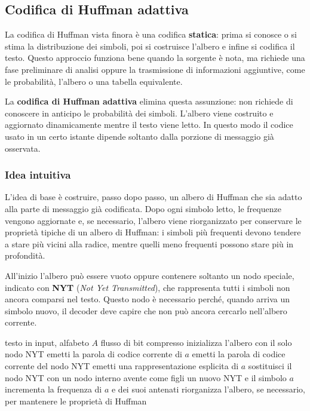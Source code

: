 \documentclass{article}
\theoremstyle{definition}
\numberwithin{equation}{section}
\begin{document}
\subsection{Codifica di Huffman adattiva}
La codifica di Huffman vista finora è una codifica \textbf{statica}: prima si conosce o si stima la distribuzione dei simboli, poi si costruisce l'albero e infine si codifica il testo. Questo approccio funziona bene quando la sorgente è nota, ma richiede una fase preliminare di analisi oppure la trasmissione di informazioni aggiuntive, come le probabilità, l'albero o una tabella equivalente.

La \textbf{codifica di Huffman adattiva} elimina questa assunzione: non richiede di conoscere in anticipo le probabilità dei simboli. L'albero viene costruito e aggiornato dinamicamente mentre il testo viene letto. In questo modo il codice usato in un certo istante dipende soltanto dalla porzione di messaggio già osservata.

\subsubsection{Idea intuitiva}
L'idea di base è costruire, passo dopo passo, un albero di Huffman che sia adatto alla parte di messaggio già codificata. Dopo ogni simbolo letto, le frequenze vengono aggiornate e, se necessario, l'albero viene riorganizzato per conservare le proprietà tipiche di un albero di Huffman: i simboli più frequenti devono tendere a stare più vicini alla radice, mentre quelli meno frequenti possono stare più in profondità.

All'inizio l'albero può essere vuoto oppure contenere soltanto un nodo speciale, indicato con \textbf{NYT} (\emph{Not Yet Transmitted}), che rappresenta tutti i simboli non ancora comparsi nel testo. Questo nodo è necessario perché, quando arriva un simbolo nuovo, il decoder deve capire che non può ancora cercarlo nell'albero corrente.

\begin{algorithm}[htpb]
    \caption{Schema della codifica di Huffman adattiva}
    \label{alg:adaptive_huffman}
    \begin{algorithmic}[1]
        \Require testo in input, alfabeto $A$
        \Ensure flusso di bit compresso
        \State inizializza l'albero con il solo nodo NYT
        \State emetti la parola di codice corrente di $a$
        \Else
        \State emetti la parola di codice corrente del nodo NYT
        \State emetti una rappresentazione esplicita di $a$
        \State sostituisci il nodo NYT con un nodo interno avente come figli un nuovo NYT e il simbolo $a$
        \EndIf
        \State incrementa la frequenza di $a$ e dei suoi antenati
        \State riorganizza l'albero, se necessario, per mantenere le proprietà di Huffman
        \EndFor
    \end{algorithmic}
\end{algorithm}
\end{document}
